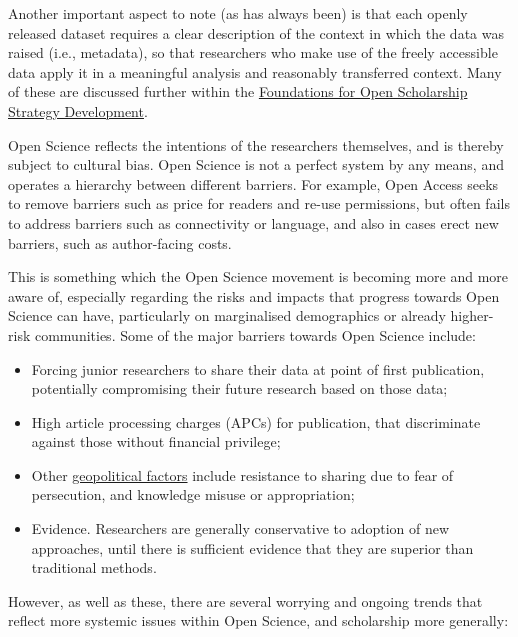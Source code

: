 \documentclass[]{book}
\begin{document}
Another important aspect to note (as has always been) is that each openly released dataset requires a clear description of the context in which the data was raised (i.e., metadata), so that researchers who make use of the freely accessible data apply it in a meaningful analysis and reasonably transferred context. Many of these are discussed further within the \href{https://open-scholarship-strategy.github.io/site/\#Challenges}{Foundations for Open Scholarship Strategy Development}.

Open Science reflects the intentions of the researchers themselves, and is thereby subject to cultural bias. Open Science is not a perfect system by any means, and operates a hierarchy between different barriers. For example, Open Access seeks to remove barriers such as price for readers and re-use permissions, but often fails to address barriers such as connectivity or language, and also in cases erect new barriers, such as author-facing costs.

This is something which the Open Science movement is becoming more and more aware of, especially regarding the risks and impacts that progress towards Open Science can have, particularly on marginalised demographics or already higher-risk communities. Some of the major barriers towards Open Science include:

\begin{itemize}
\item
  Forcing junior researchers to share their data at point of first publication, potentially compromising their future research based on those data;
\item
  High article processing charges (APCs) for publication, that discriminate against those without financial privilege;
\item
  Other \href{https://medium.com/@denalbz/power-and-inequality-in-open-science-discourses-9d425b0c2b63}{geopolitical factors} include resistance to sharing due to fear of persecution, and knowledge misuse or appropriation;
\item
  Evidence. Researchers are generally conservative to adoption of new approaches, until there is sufficient evidence that they are superior than traditional methods.
\end{itemize}

However, as well as these, there are several worrying and ongoing trends that reflect more systemic issues within Open Science, and scholarship more generally:
\end{document}

